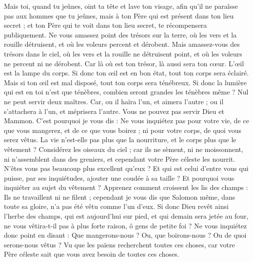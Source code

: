 \begin{multicols}{2}
Mais toi, quand tu jeûnes, oint ta tête et lave ton visage,
afin qu'il ne paraîsse pas aux hommes que tu jeûnes, mais à ton Père qui est présent dans ton lieu secret ; et ton Père qui te voit dans ton lieu secret, te récompensera publiquement.
Ne vous amassez point des trésors sur la terre, où les vers et la rouille détruisent, et où les voleurs percent et dérobent.
Mais amassez-vous des trésors dans le ciel, où les vers et la rouille ne détruisent point, et où les voleurs ne percent ni ne dérobent.
Car là où est ton trésor, là aussi sera ton cœur.
L’œil est la lampe du corps. Si donc ton œil est en bon état, tout ton corps sera éclairé.
Mais si ton œil est mal disposé, tout ton corps sera ténébreux. Si donc la lumière qui est en toi n'est que ténèbres, combien seront grandes les ténèbres même ?
Nul ne peut servir deux maîtres. Car, ou il haïra l'un, et aimera l'autre ; ou il s'attachera à l'un, et méprisera l'autre. Vous ne pouvez pas servir Dieu et Mammon{}.
C'est pourquoi je vous dis : Ne vous inquiétez pas pour votre vie, de ce que vous mangerez, et de ce que vous boirez ; ni pour votre corps, de quoi vous serez vêtus. La vie n'est-elle pas plus que la nourriture, et le corps plus que le vêtement ?
Considérez les oiseaux du ciel ; car ils ne sèment, ni ne moissonnent, ni n'assemblent dans des greniers, et cependant votre Père céleste les nourrit. N'êtes vous pas beaucoup plus excellent qu'eux ?
Et qui est celui d'entre vous qui puisse, par ses inquiétudes, ajouter une coudée à sa taille ?
Et pourquoi vous inquiéter au sujet du vêtement ? Apprenez comment croissent les lis des champs : Ils ne travaillent ni ne filent ;
cependant je vous dis que Salomon même, dans toute sa gloire, n'a pas été vêtu comme l'un d'eux.
Si donc Dieu revêt ainsi l'herbe des champs, qui est aujourd'hui sur pied, et qui demain sera jetée au four, ne vous vêtira-t-il pas à plus forte raison, ô gens de petite foi ?
Ne vous inquiétez donc point en disant : Que mangerons-nous ? Ou, que boirons-nous ? Ou de quoi serons-nous vêtus ?
Vu que les païens recherchent toutes ces choses, car votre Père céleste sait que vous avez besoin de toutes ces choses.

\end{multicols}
